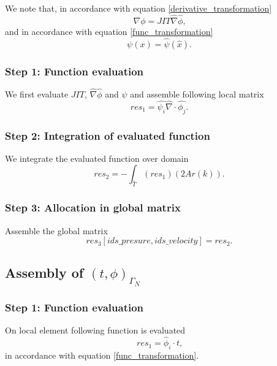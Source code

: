 \documentclass[a4paper,twoside,openright]{book}
\begin{document}
We note that, in accordance with equation \eqref{derivative_transformation}
\begin{equation}
\nabla \phi = JIT \hat{\nabla} \hat{\phi} \textrm{,}
\end{equation}
and in accordance with equation \eqref{func_transformation}
\begin{equation}
\psi(x) = \hat{\psi} (\hat{x}) \textrm{.}
\end{equation}

\subsubsection{Step 1: Function evaluation}
We first evaluate $JIT$, $\hat{\nabla} \hat{\phi}$ and $\psi$ and assemble following local matrix\\
\begin{equation}
res_1 = \hat{\psi_i} \hat{\nabla} \cdot \hat{\phi_j} \textrm{.}
\end{equation}

\subsubsection{Step 2: Integration of evaluated function}
We integrate the evaluated function over domain\\
\begin{equation}
res_2 = -\int_{\hat{T}} (res_1) (2 Ar(k)) \textrm{.}
\end{equation}

\subsubsection{Step 3: Allocation in global matrix}

Assemble the global matrix\\
\begin{equation}
res_3[ids\_presure,ids\_velocity] = res_2 \textrm{.}
\end{equation}

\subsection{Assembly of $(t,\phi)_{\Gamma_N}$}

\subsubsection{Step 1: Function evaluation}

On local element following function is evaluated 
\begin{equation}
res_1=\hat{\phi}_i \cdot t \textrm{,}
\end{equation} in accordance with equation \eqref{func_transformation}.
\end{document}
